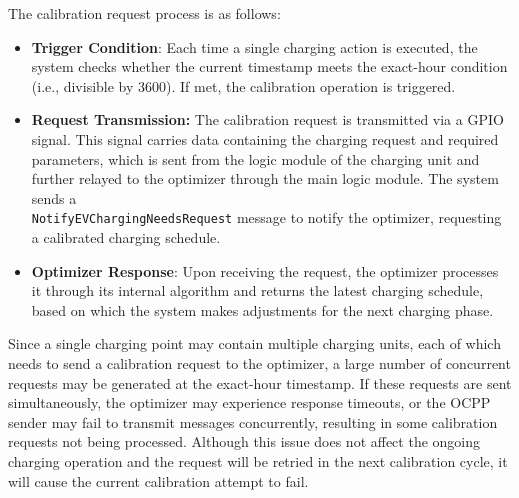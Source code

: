 \documentclass[
english,
ruledheaders=section,%
class=report,%
thesis={type=Report},%
accentcolor=9c,%
custommargins=true,%
marginpar=false,%
parskip=half-,%
fontsize=11pt,%
logofile={img/tuda_logo.pdf}, %
]{tudapub}
\begin{document}
    The calibration request process is as follows:
    \begin{itemize}
        \item \textbf{Trigger Condition}: Each time a single charging action is executed, the system checks whether the current timestamp meets the exact-hour condition (i.e., divisible by 3600). If met, the calibration operation is triggered.
        \item \textbf{Request Transmission:} The calibration request is transmitted via a GPIO signal. This signal carries data containing the charging request and required parameters, which is sent from the logic module of the charging unit and further relayed to the optimizer through the main logic module. The system sends a \\\texttt{NotifyEVChargingNeedsRequest} message to notify the optimizer, requesting a calibrated charging schedule.
        \item \textbf{Optimizer Response}: Upon receiving the request, the optimizer processes it through its internal algorithm and returns the latest charging schedule, based on which the system makes adjustments for the next charging phase.
    \end{itemize}


    Since a single charging point may contain multiple charging units, each of which needs to send a calibration request to the optimizer, a large number of concurrent requests may be generated at the exact-hour timestamp. If these requests are sent simultaneously, the optimizer may experience response timeouts, or the OCPP sender may fail to transmit messages concurrently, resulting in some calibration requests not being processed. Although this issue does not affect the ongoing charging operation and the request will be retried in the next calibration cycle, it will cause the current calibration attempt to fail.

\end{document}
